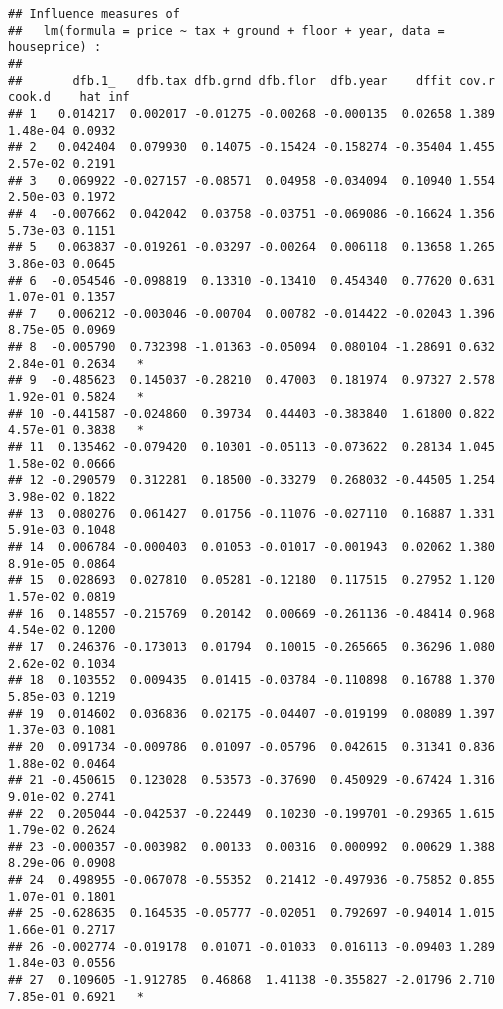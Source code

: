 \documentclass[
]{book}
\begin{document}
\begin{verbatim}
## Influence measures of
##   lm(formula = price ~ tax + ground + floor + year, data = houseprice) :
## 
##       dfb.1_   dfb.tax dfb.grnd dfb.flor  dfb.year    dffit cov.r   cook.d    hat inf
## 1   0.014217  0.002017 -0.01275 -0.00268 -0.000135  0.02658 1.389 1.48e-04 0.0932    
## 2   0.042404  0.079930  0.14075 -0.15424 -0.158274 -0.35404 1.455 2.57e-02 0.2191    
## 3   0.069922 -0.027157 -0.08571  0.04958 -0.034094  0.10940 1.554 2.50e-03 0.1972    
## 4  -0.007662  0.042042  0.03758 -0.03751 -0.069086 -0.16624 1.356 5.73e-03 0.1151    
## 5   0.063837 -0.019261 -0.03297 -0.00264  0.006118  0.13658 1.265 3.86e-03 0.0645    
## 6  -0.054546 -0.098819  0.13310 -0.13410  0.454340  0.77620 0.631 1.07e-01 0.1357    
## 7   0.006212 -0.003046 -0.00704  0.00782 -0.014422 -0.02043 1.396 8.75e-05 0.0969    
## 8  -0.005790  0.732398 -1.01363 -0.05094  0.080104 -1.28691 0.632 2.84e-01 0.2634   *
## 9  -0.485623  0.145037 -0.28210  0.47003  0.181974  0.97327 2.578 1.92e-01 0.5824   *
## 10 -0.441587 -0.024860  0.39734  0.44403 -0.383840  1.61800 0.822 4.57e-01 0.3838   *
## 11  0.135462 -0.079420  0.10301 -0.05113 -0.073622  0.28134 1.045 1.58e-02 0.0666    
## 12 -0.290579  0.312281  0.18500 -0.33279  0.268032 -0.44505 1.254 3.98e-02 0.1822    
## 13  0.080276  0.061427  0.01756 -0.11076 -0.027110  0.16887 1.331 5.91e-03 0.1048    
## 14  0.006784 -0.000403  0.01053 -0.01017 -0.001943  0.02062 1.380 8.91e-05 0.0864    
## 15  0.028693  0.027810  0.05281 -0.12180  0.117515  0.27952 1.120 1.57e-02 0.0819    
## 16  0.148557 -0.215769  0.20142  0.00669 -0.261136 -0.48414 0.968 4.54e-02 0.1200    
## 17  0.246376 -0.173013  0.01794  0.10015 -0.265665  0.36296 1.080 2.62e-02 0.1034    
## 18  0.103552  0.009435  0.01415 -0.03784 -0.110898  0.16788 1.370 5.85e-03 0.1219    
## 19  0.014602  0.036836  0.02175 -0.04407 -0.019199  0.08089 1.397 1.37e-03 0.1081    
## 20  0.091734 -0.009786  0.01097 -0.05796  0.042615  0.31341 0.836 1.88e-02 0.0464    
## 21 -0.450615  0.123028  0.53573 -0.37690  0.450929 -0.67424 1.316 9.01e-02 0.2741    
## 22  0.205044 -0.042537 -0.22449  0.10230 -0.199701 -0.29365 1.615 1.79e-02 0.2624    
## 23 -0.000357 -0.003982  0.00133  0.00316  0.000992  0.00629 1.388 8.29e-06 0.0908    
## 24  0.498955 -0.067078 -0.55352  0.21412 -0.497936 -0.75852 0.855 1.07e-01 0.1801    
## 25 -0.628635  0.164535 -0.05777 -0.02051  0.792697 -0.94014 1.015 1.66e-01 0.2717    
## 26 -0.002774 -0.019178  0.01071 -0.01033  0.016113 -0.09403 1.289 1.84e-03 0.0556    
## 27  0.109605 -1.912785  0.46868  1.41138 -0.355827 -2.01796 2.710 7.85e-01 0.6921   *
\end{verbatim}
\end{document}

